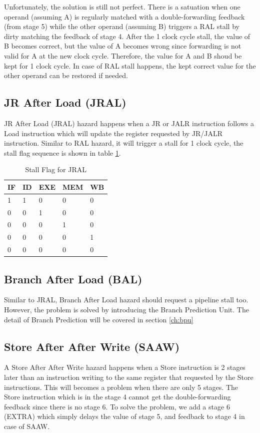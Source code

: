 Unfortunately, the solution is still not perfect. There is a satuation when one
operand (assuming A) is regularly matched with a double-forwarding feedback (from
stage 5) while the other operand (assuming B) triggers a RAL stall by dirty matching
the feedback of stage 4. After the 1 clock cycle stall, the value of B becomes correct,
but the value of A becomes wrong since forwarding is not valid for A at the new clock cycle.
Therefore, the value for A and B shoud be kept for 1 clock cycle. In case of RAL stall happens, the
kept correct value for the other operand can be restored if needed.

\subsection[JR After Load (JRAL)]{JR After Load (JRAL)}
JR After Load (JRAL) hazard happens when a JR or JALR instruction follows a Load
instruction which will update the register requested by JR/JALR instruction. Similar
to RAL hazard, it will trigger a stall for 1 clock cycle, the stall flag sequence is
shown in table \ref{tab:stall_jral}.

\begin{table}[!ht]
\centering
\caption{Stall Flag for JRAL}
\label{tab:stall_jral}
\begin{tabular}{|l|l|l|l|l|}
\hline
IF & ID & EXE & MEM & WB \\
\hline
1  & 1  & 0  & 0  & 0\\
0  & 0  & 1  & 0  & 0\\
0  & 0  & 0  & 1  & 0\\
0  & 0  & 0  & 0  & 1\\
0  & 0  & 0  & 0  & 0 \\
\hline
\end{tabular}
\end{table}

\subsection[Branch After Load (BAL)]{Branch After Load (BAL)}
Similar to JRAL, Branch After Load hazard should request a pipeline stall too. However,
the problem is solved by introducing the Branch Prediction Unit. The
detail of Branch Prediction will be covered in section \ref{ch:bpu}

\subsection[Store After After Write (SAAW)]{Store After After Write (SAAW)}
A Store After After Write hazard happens when a Store instruction is 2 stages later than
an instruction writing to the same register that requested by the Store instructions.
This will becomes a problem when there are only 5 stages. The Store instruction which
is in the stage 4 cannot get the double-forwarding feedback since there is no stage 6.
To solve the problem, we add a stage 6 (EXTRA) which simply delays the value of stage 5,
and feedback to stage 4 in case of SAAW.

